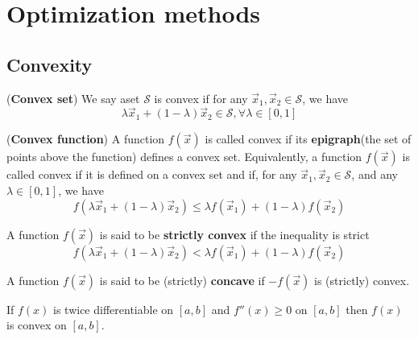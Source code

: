 \chapter{Optimization methods}
\label{chap:Optimization-methods}


\section{Convexity}
\label{sec:Convexity}

\begin{definition}
(\textbf{Convex set}) We say aset $\mathcal{S}$ is convex if for any $\vec{x}_1, \vec{x}_2 \in \mathcal{S}$, we have
\begin{equation}
\lambda\vec{x}_1+(1-\lambda)\vec{x}_2 \in \mathcal{S}, \forall \lambda \in [0,1]
\end{equation}
\end{definition}

\begin{definition}
(\textbf{Convex function}) A function $f(\vec{x})$ is called convex if its \textbf{epigraph}(the set of points above the function) defines a convex set. Equivalently, a function $f(\vec{x})$ is called convex if it is defined on a convex set and if, for any $\vec{x}_1, \vec{x}_2 \in \mathcal{S}$, and any $\lambda \in [0,1]$, we have
\begin{equation}
f(\lambda\vec{x}_1+(1-\lambda)\vec{x}_2) \leq \lambda f(\vec{x}_1)+(1-\lambda)f(\vec{x}_2)
\end{equation}
\end{definition}

\begin{definition}
A function $f(\vec{x})$ is said to be \textbf{strictly convex} if the inequality is strict
\begin{equation}
f(\lambda \vec{x}_1 + (1 - \lambda)\vec{x}_2) < \lambda f(\vec{x}_1) + (1 - \lambda)f(\vec{x}_2)
\end{equation}
\end{definition}

\begin{definition}
A function $f(\vec{x})$ is said to be (strictly) \textbf{concave} if $-f(\vec{x})$ is (strictly) convex.
\end{definition}

\begin{theorem}
If $f(x)$ is twice differentiable on $[a, b]$ and $f''(x) \geq 0$ on $[a, b]$ then $f(x)$ is convex on $[a, b]$.
\end{theorem}

